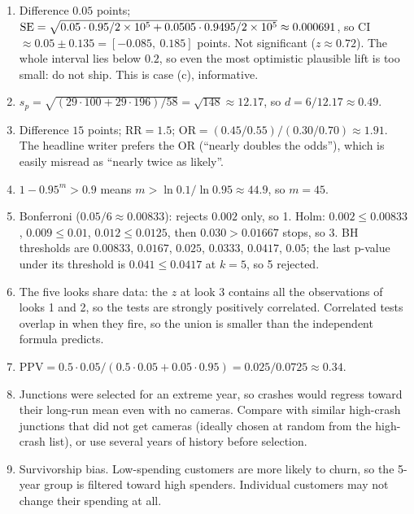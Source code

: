 \begin{enumerate}
\item Difference $0.05$ points; $\operatorname{SE}=\sqrt{0.05\cdot0.95/2\times10^{5}+0.0505\cdot0.9495/2\times10^{5}}\approx0.000691$,
  so CI $\approx 0.05\pm0.135=[-0.085,\ 0.185]$ points. Not significant
  ($z\approx0.72$). The whole interval lies below $0.2$, so even the most
  optimistic plausible lift is too small: do not ship. This is case (c), informative.
\item $s_p=\sqrt{(29\cdot100+29\cdot196)/58}=\sqrt{148}\approx12.17$, so
  $d=6/12.17\approx0.49$.
\item Difference $15$ points; $\mathrm{RR}=1.5$;
  $\mathrm{OR}=(0.45/0.55)/(0.30/0.70)\approx1.91$. The headline writer prefers the
  OR (``nearly doubles the odds''), which is easily misread as ``nearly twice as likely''.
\item $1-0.95^m>0.9$ means $m>\ln 0.1/\ln 0.95\approx 44.9$, so $m=45$.
\item Bonferroni ($0.05/6\approx0.00833$): rejects $0.002$ only, so 1.
  Holm: $0.002\le0.00833$, $0.009\le0.01$, $0.012\le0.0125$, then $0.030>0.01667$
  stops, so 3. BH thresholds are $0.00833$, $0.0167$, $0.025$, $0.0333$, $0.0417$,
  $0.05$; the last p-value under its threshold is $0.041\le0.0417$ at
  $k=5$, so 5 rejected.
\item The five looks share data: the $z$ at look 3 contains all the observations of
  looks 1 and 2, so the tests are strongly positively correlated. Correlated tests
  overlap in when they fire, so the union is smaller than the independent formula predicts.
\item $\mathrm{PPV}=0.5\cdot0.05/(0.5\cdot0.05+0.05\cdot0.95)=0.025/0.0725\approx0.34$.
\item Junctions were selected for an extreme year, so crashes would regress toward
  their long-run mean even with no cameras. Compare with similar high-crash junctions
  that did not get cameras (ideally chosen at random from the high-crash list), or
  use several years of history before selection.
\item Survivorship bias. Low-spending customers are more likely to churn, so the
  5-year group is filtered toward high spenders. Individual customers may not change
  their spending at all.
\end{enumerate}
